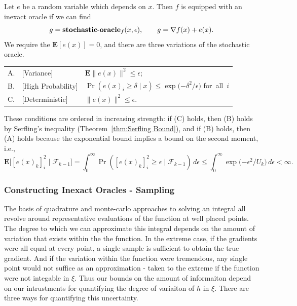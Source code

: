 \begin{defn} \label{defn: 0-1 Epsilon Oracle} Let $e$ be a 
random variable which depends on $x$. Then $f$ is equipped with an inexact oracle if we can find
$$
g=\mbox{{\bf stochastic}-{\bf oracle}}_f(x,\epsilon), \qquad g =\nabla f(x)+e(x).
$$
We require the $\mathbf{E}[e(x)] = 0$, and there are three variations of the
stochastic oracle.

\vspace{2mm}
\begin{tabular}{l@{\ }ll}
  A. &[Variance] &$\mathbf{E} \|e(x)\|^2 \leq \epsilon$;
  \\[6pt]
  B. &[High Probability] & $
  \Pr\left(e(x)_i \geq\delta\mid x\right)
  \leq\exp\big({-\delta^{2}/\epsilon}\big)$ \quad \mbox{for all $i$}
\\[6pt]
C. &[Deterministic] &$\|e(x)\|^2 \leq \epsilon$.
\end{tabular}
\end{defn}

These conditions are ordered in increasing strength: if (C) holds,
then (B) holds by Serfling's inequality
(Theorem~\ref{thm:Serfling Bound}), and if (B) holds, then
(A) holds because the exponential bound implies a bound on the second
moment, i.e.,
\[
\mathbf{E} \big[[e(x)_{k}]_{i}^{2}\mid \mathcal{F}_{k-1}\big] = \int_{0}^{\infty}\!\! 
\Pr([e(x)_{k}]_{i}^{2} \geq \epsilon\mid\mathcal{F}_{k-1})\,d\epsilon \leq \int_{0}^{\infty}\!\!
\exp\big({-\epsilon^{2}/U_{k}}\big)\,d\epsilon < \infty.
\]

\subsubsection{Constructing Inexact Oracles - Sampling} The basis of
quadrature and monte-carlo approaches to solving an integral all revolve
around representative evaluations of the function at well placed points. The
degree to which we can approximate this integral depends on the amount of
variation that exists within the the function. In the extreme case, if the
gradients were all equal at every point, a single sample is sufficient to
obtain the true gradient. And if the variation within the function were
tremendous, any single point would not suffice as an approximation - taken
to the extreme if the function were not integable in $\xi$. Thus our bounds
on the amount of informaiton depend on our intrustments for quantifying
the degree of variaiton of $h$ in $\xi$. There are three ways for quantifying 
this uncertainty.

